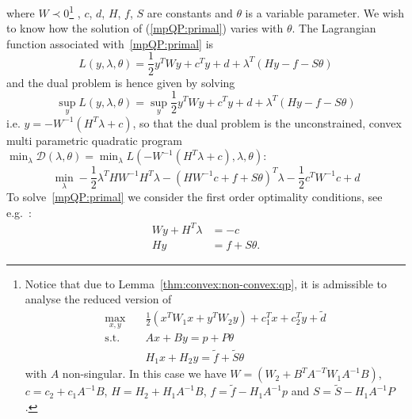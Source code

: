 %
where $W\prec 0$\footnote{%
%
Notice that due to Lemma~\ref{thm:convex:non-convex:qp}, it is admissible to analyse the reduced version of
%
$$\begin{aligned}
\max_{x,y}&\quad \frac{1}{2}(x^TW_1x+y^TW_2y)+c_1^Tx+c_2^Ty+\tilde d\\
\text{s.t.}&\quad Ax+By=p + P\theta\\
&\quad H_1x+H_2y = \tilde f+\tilde S\theta
\end{aligned}
$$
%
with $A$ non-singular.
%
In this case we have $W = (W_2+B^TA^{-T}W_1A^{-1}B)$, $c = c_2+c_1A^{-1}B$, $H = H_2+H_1A^{-1}B$, $f=\tilde f-H_1A^{-1}p$ and $S=\tilde S-H_1A^{-1}P$.
}
%
, $c$, $d$, $H$, $f$, $S$ are constants and $\theta$ is a variable parameter. 
%
We wish to know how the solution of (\ref{mpQP:primal}) varies with $\theta$.
%
The Lagrangian function associated with~\eqref{mpQP:primal} is
%
\[
	L(y,\lambda,\theta)  = \frac{1}{2} y^T W y + c^Ty + d + \lambda^T(Hy - f - S\theta)
\]
%
and the dual problem is hence given by solving
%
\[
	\sup_y L(y,\lambda,\theta) = \sup_y \frac{1}{2} y^T W y + c^Ty + d + \lambda^T(Hy - f - S\theta)
\]
%
i.e. $y = -W^{-1}(H^T\lambda+c)$, so that the dual problem is the unconstrained, convex multi parametric quadratic program $\min_\lambda\mathcal D(\lambda,\theta) = \min_\lambda L(-W^{-1}(H^T\lambda+c),\lambda,\theta)$:
%
\begin{equation}\label{mpQP:dual}
	\min_\lambda-\frac{1}{2}\lambda^T H W^{-1}H^T \lambda 
	-(HW^{-1}c+ f + S\theta)^T\lambda
	-\frac{1}{2}c^TW^{-1}c +d
	\end{equation}
%
To solve~\eqref{mpQP:primal} we consider the first order optimality conditions, see e.g.~\cite{Fletcher:1987}:
%
\begin{equation}\label{kkt:conditions}
	\begin{aligned}
        W y + H^T\lambda & = -c \\
        H y &= f + S\theta.
	\end{aligned}
\end{equation}

